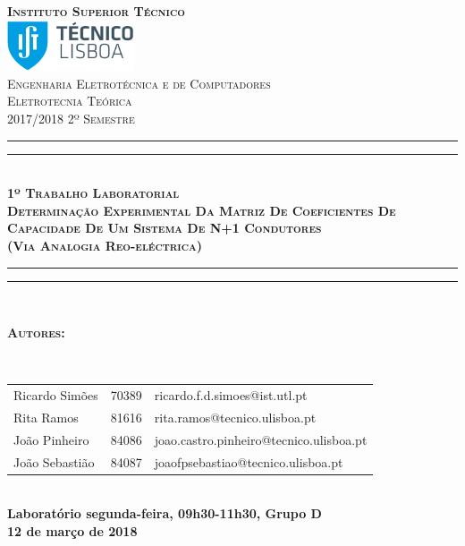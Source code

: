\documentclass[portuguese, a4paper]{article}
\begin{document}
	\hypersetup{pageanchor=false}
	\begin{titlepage}
		\center
		\textsc{\bfseries\LARGE Instituto Superior Técnico}\\[1cm] %
		\includegraphics[height=1.5cm]{IST_Logo.pdf}\\[2.5cm]

		\textsc{\large Engenharia Eletrotécnica e de Computadores}\\[0.5cm] %
		\textsc{\Large Eletrotecnia Teórica}\\[0.5cm] %
		\textsc{\large 2017/2018 2º Semestre}\\[2cm]

		\rule{\textwidth}{1.6pt}\vspace*{-\baselineskip}\vspace*{2pt} %
		\rule{\textwidth}{0.4pt}\\[\baselineskip] %
			\textsc{\Huge \bfseries 1º Trabalho Laboratorial}\\[0.2cm]
			\bigskip
			\textsc{\large \bfseries Determinação Experimental Da Matriz De Coeficientes De Capacidade De Um Sistema De N+1 Condutores \\
			(Via Analogia Reo-eléctrica)}\\[0.2cm]
		\rule{\textwidth}{0.4pt}\vspace*{-\baselineskip}\vspace{3.2pt} %
		\rule{\textwidth}{1.6pt}\\[5cm]

		\begin{minipage}{0.9\textwidth}
			\begin{flushleft} \large
				\begin{Large}\bfseries\textsc{Autores:}\end{Large}\\[0.4cm]
				\begin{tabular}{l l l}
					Ricardo Simões			& 70389 & \normalsize ricardo.f.d.simoes@ist.utl.pt \\
					Rita Ramos					& 81616 & \normalsize rita.ramos@tecnico.ulisboa.pt \\
					João Pinheiro				& 84086 & \normalsize joao.castro.pinheiro@tecnico.ulisboa.pt \\
					João Sebastião			& 84087 & \normalsize joaofpsebastiao@tecnico.ulisboa.pt \\
				\end{tabular}
			\end{flushleft}
		\end{minipage}\\[0.5cm]

		\large \bfseries Laboratório segunda-feira, 09h30-11h30, Grupo D\\
		\large 12 de março de 2018\\[1cm]
	\end{titlepage}
	\hypersetup{pageanchor=true}
\end{document}

